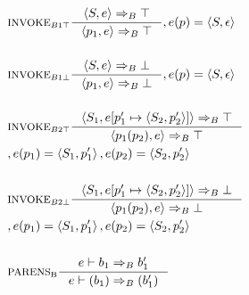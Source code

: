 \begin{align*}
&\inference[$\text{INVOKE}_{B1\top}$]{\Braket{S,e} \Rightarrow_B \top}
                  {\Braket{p_1,e} \Rightarrow_B \top}
                  {,e(p) = \Braket{S,\epsilon}}
\\\\
&\inference[$\text{INVOKE}_{B1\bot}$]{\Braket{S,e} \Rightarrow_B \bot}
                  {\Braket{p_1,e} \Rightarrow_B \bot}
                  {,e(p) = \Braket{S,\epsilon}}
\\\\
&\inference[$\text{INVOKE}_{B2\top}$]{\Braket{S_1,e[p_1' \mapsto \Braket{S_2,p_2'}]} \Rightarrow_B \top}
                  {\Braket{p_1(p_2),e} \Rightarrow_B \top}
\\                  
&                 {,e(p_1) = \Braket{S_1,p_1'}, e(p_2) = \Braket{S_2,p_2'}}
\\\\
&\inference[$\text{INVOKE}_{B2\bot}$]{\Braket{S_1,e[p_1' \mapsto \Braket{S_2,p_2'}]} \Rightarrow_B \bot}
                  {\Braket{p_1(p_2),e} \Rightarrow_B \bot}
\\                  
&                 {,e(p_1) = \Braket{S_1,p_1'}, e(p_2) = \Braket{S_2,p_2'}}
\\\\
&\inference[$\text{PARENS}_\text{B}$]{e \vdash b_1 \Rightarrow_B b_1'}
                       {e \vdash (b_1) \Rightarrow_B (b_1')}
\end{align*}

